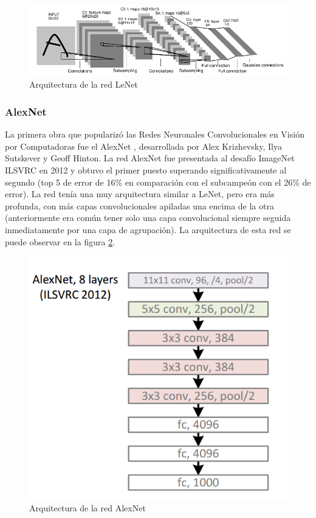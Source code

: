 \documentclass[a4paper,11pt,spanish]{book}
\begin{document}
	  \begin{figure}[h]
	    \begin{center}
	    \includegraphics[width=0.6\linewidth]{./img/lenet.png}
	    \end{center}
	    \caption{Arquitectura de la red LeNet}
	    \label{fig:lenet}
	  \end{figure}

	\subsubsection{AlexNet} \label{sec:alexnet}
	  La primera obra que popularizó las Redes Neuronales Convolucionales en Visión por Computadoras fue el AlexNet  \cite{AlexNet}, desarrollada por Alex Krizhevsky, Ilya Sutskever y Geoff Hinton.
	  La red AlexNet fue presentada al desafío ImageNet ILSVRC  en 2012 y obtuvo el primer puesto superando significativamente al segundo (top 5 de error de 16\% en comparación con el
	  subcampeón con el 26\% de error). La red tenía una muy arquitectura similar a LeNet, pero era más profunda, con más  capas convolucionales apiladas una encima de la otra
	  (anteriormente era común tener solo una capa convolucional siempre seguida inmediatamente por una capa de agrupación). La arquitectura de esta red se puede observar en la figura 
	  \ref{fig:alexnet}.
	  
	  \begin{figure}[h]
	    \begin{center}
	    \includegraphics[width=0.6\linewidth]{./img/alexnet.png}
	    \end{center}
	    \caption{Arquitectura de la red AlexNet}
	    \label{fig:alexnet}
	  \end{figure}	  
\end{document}
